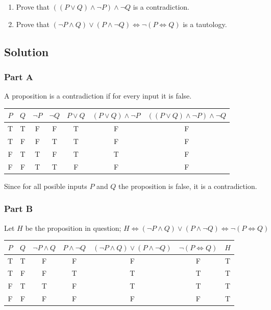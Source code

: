 \documentclass[12pt]{extarticle}
\begin{document}
\begin{enumerate}[label=(\alph*)]
  \item Prove that $((P \lor Q) \land \lnot P) \land \lnot Q$ is a contradiction.
  \item Prove that $(\lnot P \land Q) \lor (P \land \lnot Q) \Longleftrightarrow \lnot(P \Longleftrightarrow Q)$ is a tautology.
\end{enumerate}

\subsection*{Solution}
\subsubsection*{Part A}

A proposition is a contradiction if for every input it is false.

\begin{table}[h!]
	\centering
	\begin{tabular}{cc || c|c|c|c||c}
		$P$ & $Q$ & $\lnot P$ & $\lnot Q$ & $P \lor Q$ & $(P \lor Q) \land \lnot P$ & $((P \lor Q) \land \lnot P) \land \lnot Q$ \\\hline
    T & T & F & F & T & F & F \\
    T & F & F & T & T & F & F \\
    F & T & T & F & T & T & F \\
    F & F & T & T & F & F & F \\
	\end{tabular}
\end{table}

Since for all posible inputs $P$ and $Q$ the proposition is false, it is a contradiction.

\newpage
\subsubsection*{Part B}

Let $H$ be the proposition in question; $H \Longleftrightarrow (\lnot P \land Q) \lor (P \land \lnot Q) \Longleftrightarrow \lnot(P \Longleftrightarrow Q) $

\begin{table}[h!]
	\centering
	\begin{tabular}{cc || c|c|c|c||c}
		$P$ & $Q$ & $\lnot P \land Q$ & $P \land \lnot Q$ & $(\lnot P \land Q)\lor(P \land \lnot Q)$ & $\lnot(P \Longleftrightarrow Q)$ & $H$\\\hline
		T	& T & F & F & F & F & T \\ 
		T	& F & F & T & T & T & T \\ 
		F	& T & T & F & T & T & T \\ 
		F	& F & F & F & F & F & T
	\end{tabular}
\end{table}
\end{document}

